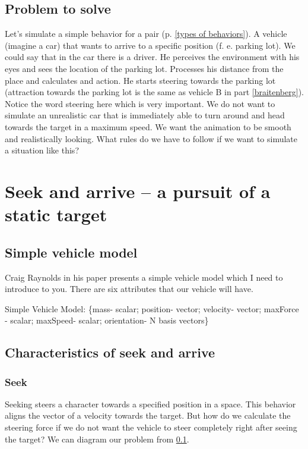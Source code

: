 \documentclass[10pt,twoside,english,a4paper]{article}
\begin{document}
\subsection{Problem to solve} \label{problem to solve}

Let’s simulate a simple behavior for a pair (p. \ref{types of behaviors}). A vehicle (imagine a car) that wants to arrive to a specific position (f. e. parking lot). We could say that in the car there is a driver. He perceives the environment with his eyes and sees the location of the parking lot. Processes his distance from the place and calculates and action. He starts steering towards the parking lot (attraction towards the parking lot is the same as vehicle B in part \ref{braitenberg}). Notice the word steering here which is very important. We do not want to simulate an unrealistic car that is immediately able to turn around and head towards the target in a maximum speed. We want the animation to be smooth and realistically looking. What rules do we have to follow if we want to simulate a situation like this?


\section{Seek and arrive – a pursuit of a static target} \label{seek and arrive}

\subsection{Simple vehicle model} \label{model}
Craig Raynolds in his paper \cite{Raynolds} presents a simple vehicle model which I need to introduce to you. There are six attributes that our vehicle will have. 

Simple Vehicle Model: \{mass- scalar; position- vector; velocity-	vector; maxForce - scalar; maxSpeed- scalar; orientation- N basis vectors\}

\subsection{Characteristics of seek and arrive } \label{characterictics of seek and arrive}

\subsubsection{Seek} \label{seek}

Seeking steers a character towards a specified position in a space. This behavior aligns the vector of a velocity towards the target. But how do we calculate the steering force if we do not want the vehicle to steer completely right after seeing the target? We can diagram our problem from \ref{problem to solve}.
\end{document}
